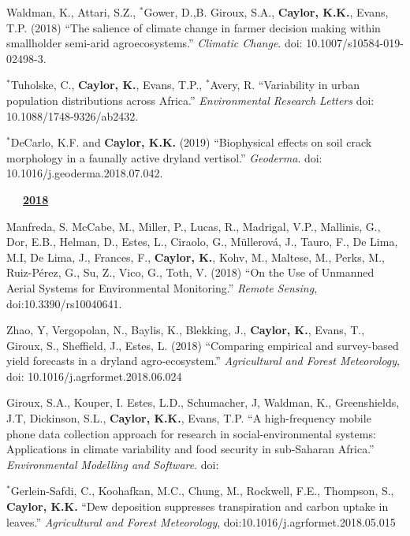 \documentclass[10pt]{report}
\begin{document}
\begin{etaremune}
\item Waldman, K., Attari, S.Z., \small $^{*}$Gower, D.,B. Giroux, S.A., \textbf{Caylor, K.K.}, Evans, T.P. (2018) ``The salience of climate change in farmer decision making within smallholder semi-arid agroecosystems.'' {\em Climatic Change}. doi: 10.1007/s10584-019-02498-3.

\item $^{*}$Tuholske, C., \textbf{Caylor, K.}, Evans, T.P., $^{*}$Avery, R. ``Variability in urban population distributions across Africa.'' {\em Environmental Research Letters} doi: 10.1088/1748-9326/ab2432.

\item $^{*}$DeCarlo, K.F. and \textbf{Caylor, K.K.} (2019) ``Biophysical effects on soil crack morphology in a faunally active dryland vertisol.'' {\em Geoderma}. doi: 10.1016/j.geoderma.2018.07.042.

\mbox{\ \ \ \underline{\textbf{2018}}}

\item Manfreda, S. McCabe, M., Miller, P., Lucas, R.,  Madrigal, V.P., Mallinis, G., Dor, E.B., Helman, D., Estes, L., Ciraolo, G., Müllerová, J., Tauro, F., De Lima, M.I, De Lima, J., Frances, F., \textbf{Caylor, K.}, Kohv, M., Maltese, M., Perks, M., Ruiz-Pérez, G., Su, Z., Vico, G., Toth, V. (2018) ``On the Use of Unmanned Aerial Systems for Environmental Monitoring.'' {\em Remote Sensing}, doi:10.3390/rs10040641.


\item Zhao, Y, Vergopolan, N., Baylis, K., Blekking, J.,  \textbf{Caylor, K.}, Evans, T., Giroux, S., Sheffield, J., Estes, L. (2018) ``Comparing empirical and survey-based yield forecasts in a dryland agro-ecosystem.'' {\em Agricultural and Forest Meteorology}, doi: 10.1016/j.agrformet.2018.06.024
 
\item Giroux, S.A., Kouper, I. Estes, L.D., Schumacher, J, Waldman, K., Greenshields, J.T, Dickinson, S.L., \textbf{Caylor, K.K.}, Evans, T.P.  ``A high-frequency mobile phone data collection approach for research in social-environmental systems: Applications in climate variability and food security in sub-Saharan Africa.'' {\em Environmental Modelling and Software}. doi:


\item $^{*}$Gerlein-Safdi, C., Koohafkan, M.C., Chung, M., Rockwell, F.E., Thompson, S., \textbf{Caylor, K.K.} ``Dew deposition suppresses transpiration and carbon uptake in leaves.'' {\em Agricultural and Forest Meteorology}, doi:10.1016/j.agrformet.2018.05.015


\end{etaremune}
\end{document}
